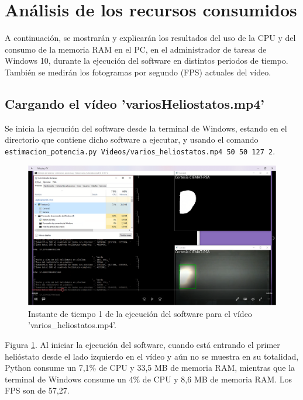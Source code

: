 \section{Análisis de los recursos consumidos}

A continuación, se mostrarán y explicarán los resultados del uso de la CPU y del consumo de la memoria RAM en el PC, en el administrador de tareas de Windows 10, durante la ejecución del software en distintos periodos de tiempo. También se medirán los fotogramas por segundo (FPS) actuales del vídeo.

\subsection{Cargando el vídeo 'variosHeliostatos.mp4'}

Se inicia la ejecución del software desde la terminal de Windows, estando en el directorio que contiene dicho software a ejecutar, y usando el comando \verb|estimacion_potencia.py Videos/varios_heliostatos.mp4 50 50 127 2|.

\begin{figure}[h!]
  	\centering
	\includegraphics[width=\textwidth]{CapturasRendimientoSoftware1/Imagen1.png}
	\caption{Instante de tiempo 1 de la ejecución del software para el vídeo 'varios\_heliostatos.mp4'.
	\label{fig:CapturasRendimientoSoftware1/Imagen1.png}}
\end{figure}

Figura \ref{fig:CapturasRendimientoSoftware1/Imagen1.png}. Al iniciar la ejecución del software, cuando está entrando el primer helióstato desde el lado izquierdo en el vídeo y aún no se muestra en su totalidad, Python consume un 7,1\% de CPU y 33,5 MB de memoria RAM, mientras que la terminal de Windows consume un 4\% de CPU y 8,6 MB de memoria RAM. Los FPS son de 57,27.\\[20pt]

